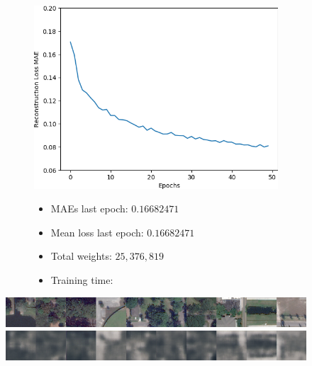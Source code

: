 \vspace{-3em}

\begin{figure}[H]
    \centering
    \begin{subfigure}{.5\textwidth}
        \centering
        \includegraphics[width=\textwidth]
        {images/figures/experiments_architecture/mae_graphKernel3adjusted2x2x256_dim1024.png}
    \end{subfigure}%
    \begin{subfigure}{.5\textwidth}
      \begin{itemize}
          \item MAEs last epoch: $0.16682471$
          \item Mean loss last epoch: $0.16682471$
          \item Total weights: $25,376,819$
          \item Training time:
      \end{itemize}
    \end{subfigure}
\end{figure}

\vspace{-2em}

\begin{figure}[H]
    \centering
    \includegraphics[width=\textwidth]
    {images/figures/experiments_architecture/inputsKernel3adjusted2x2x256_dim1024.png}
    \includegraphics[width=\textwidth]
    {images/figures/experiments_architecture/reconstructionsKernel3adjusted2x2x256_dim1024.png}
\end{figure}




